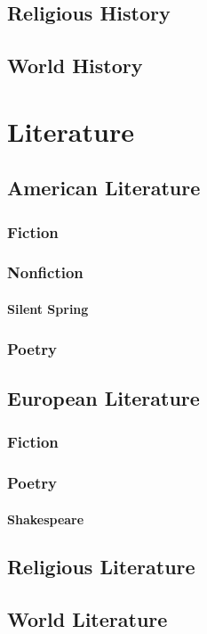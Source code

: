 \documentclass[12pt]{book}
\begin{document}
	\section{Religious History}
	\section{World History}
	
	
	
\chapter{Literature}
	\section{American Literature}
		\subsection{Fiction}
		\subsection{Nonfiction}
			\subsubsection{Silent Spring}
		\subsection{Poetry}

		
	\section{European Literature}
		\subsection{Fiction}
		\subsection{Poetry}
		\subsubsection{Shakespeare}
	\section{Religious Literature}
	\section{World Literature}
	
\end{document}
